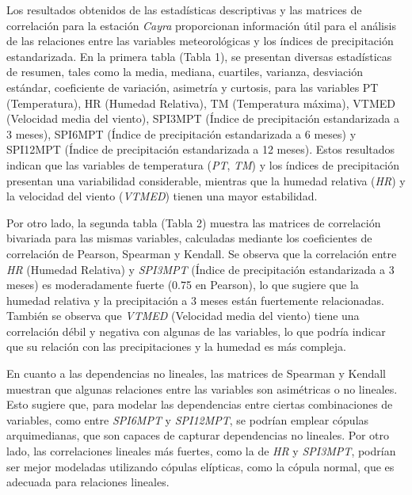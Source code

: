 \begin{figure}[htbp]
\begin{minipage}{0.32\textwidth}
\end{minipage}

\end{figure}


Los resultados obtenidos de las estadísticas descriptivas y las matrices de correlación para la estación \textit{Cayra} proporcionan información útil para el análisis de las relaciones entre las variables meteorológicas y los índices de precipitación estandarizada. En la primera tabla (Tabla 1), se presentan diversas estadísticas de resumen, tales como la media, mediana, cuartiles, varianza, desviación estándar, coeficiente de variación, asimetría y curtosis, para las variables PT (Temperatura), HR (Humedad Relativa), TM (Temperatura máxima), VTMED (Velocidad media del viento), SPI3MPT (Índice de precipitación estandarizada a 3 meses), SPI6MPT (Índice de precipitación estandarizada a 6 meses) y SPI12MPT (Índice de precipitación estandarizada a 12 meses). Estos resultados indican que las variables de temperatura (\textit{PT}, \textit{TM}) y los índices de precipitación presentan una variabilidad considerable, mientras que la humedad relativa (\textit{HR}) y la velocidad del viento (\textit{VTMED}) tienen una mayor estabilidad.

Por otro lado, la segunda tabla (Tabla 2) muestra las matrices de correlación bivariada para las mismas variables, calculadas mediante los coeficientes de correlación de Pearson, Spearman y Kendall. Se observa que la correlación entre \textit{HR} (Humedad Relativa) y \textit{SPI3MPT} (Índice de precipitación estandarizada a 3 meses) es moderadamente fuerte (0.75 en Pearson), lo que sugiere que la humedad relativa y la precipitación a 3 meses están fuertemente relacionadas. También se observa que \textit{VTMED} (Velocidad media del viento) tiene una correlación débil y negativa con algunas de las variables, lo que podría indicar que su relación con las precipitaciones y la humedad es más compleja.

En cuanto a las dependencias no lineales, las matrices de Spearman y Kendall muestran que algunas relaciones entre las variables son asimétricas o no lineales. Esto sugiere que, para modelar las dependencias entre ciertas combinaciones de variables, como entre \textit{SPI6MPT} y \textit{SPI12MPT}, se podrían emplear cópulas arquimedianas, que son capaces de capturar dependencias no lineales. Por otro lado, las correlaciones lineales más fuertes, como la de \textit{HR} y \textit{SPI3MPT}, podrían ser mejor modeladas utilizando cópulas elípticas, como la cópula normal, que es adecuada para relaciones lineales.

